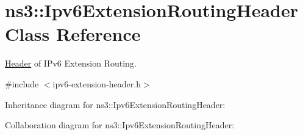 \hypertarget{classns3_1_1Ipv6ExtensionRoutingHeader}{}\section{ns3\+:\+:Ipv6\+Extension\+Routing\+Header Class Reference}
\label{classns3_1_1Ipv6ExtensionRoutingHeader}


\hyperlink{classns3_1_1Header}{Header} of I\+Pv6 Extension Routing.  




{\ttfamily \#include $<$ipv6-\/extension-\/header.\+h$>$}



Inheritance diagram for ns3\+:\+:Ipv6\+Extension\+Routing\+Header\+:


Collaboration diagram for ns3\+:\+:Ipv6\+Extension\+Routing\+Header\+:
